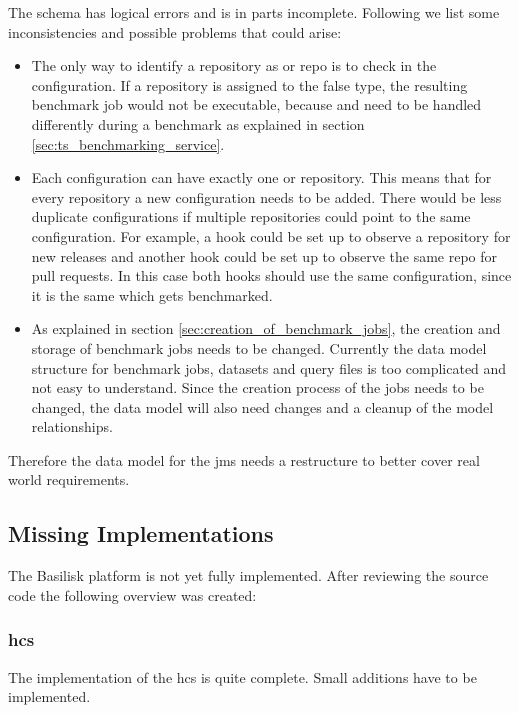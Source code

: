 The schema has logical errors and is in parts incomplete.
Following we list some inconsistencies and possible problems that could arise:
\begin{itemize}
	\item The only way to identify a repository as \gh{} or \dockh{} repo is to check in the \ts{} configuration.
		If a repository is assigned to the false type, the resulting benchmark job would not be executable, because \gh{} and \dockh{} need to be handled differently during a benchmark as explained in section \ref{sec:ts_benchmarking_service}.
	
	\item Each \ts{} configuration can have exactly one \gh{} or \dockh{} repository.
		This means that for every repository a new \ts{} configuration needs to be added.
		There would be less duplicate configurations if multiple repositories could point to the same configuration.
		For example, a hook could be set up to observe a \gh{} repository for new releases and another hook could be set up to observe the same \gh{} repo for pull requests.
		In this case both hooks should use the same \ts{} configuration, since it is the same \ts{} which gets benchmarked.
		
	\item As explained in section \ref{sec:creation_of_benchmark_jobs}, the 	creation and storage of benchmark jobs needs to be changed.
		Currently the data model structure for benchmark jobs, datasets and query files is too complicated and not easy to understand.
		Since the creation process of the jobs needs to be changed, the data model will also need changes and a cleanup of the model relationships.
	
\end{itemize} 

Therefore the data model for the \ac{jms} needs a restructure to better cover real world requirements.


\subsection{Missing Implementations}
\label{sec:review_missing_impl}
The Basilisk platform is not yet fully implemented.
After reviewing the source code the following overview was created:

\subsubsection{\acl{hcs}}
The implementation of the \acl{hcs} is quite complete.
Small additions have to be implemented.

